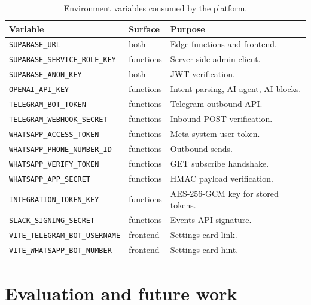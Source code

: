 \documentclass[11pt,a4paper,oneside]{article}
\newcommand{\code}[1]{\texttt{\small #1}}
\begin{document}
\begin{table}[H]
\centering
\small
\begin{tabularx}{\textwidth}{@{}llX@{}}
\toprule
\textbf{Variable}                  & \textbf{Surface} & \textbf{Purpose} \\
\midrule
\code{SUPABASE\_URL}               & both       & Edge functions and frontend. \\
\code{SUPABASE\_SERVICE\_ROLE\_KEY}& functions  & Server-side admin client. \\
\code{SUPABASE\_ANON\_KEY}         & both       & JWT verification. \\
\code{OPENAI\_API\_KEY}            & functions  & Intent parsing, AI agent, AI blocks. \\
\code{TELEGRAM\_BOT\_TOKEN}        & functions  & Telegram outbound API. \\
\code{TELEGRAM\_WEBHOOK\_SECRET}   & functions  & Inbound POST verification. \\
\code{WHATSAPP\_ACCESS\_TOKEN}     & functions  & Meta system-user token. \\
\code{WHATSAPP\_PHONE\_NUMBER\_ID} & functions  & Outbound sends. \\
\code{WHATSAPP\_VERIFY\_TOKEN}     & functions  & GET subscribe handshake. \\
\code{WHATSAPP\_APP\_SECRET}       & functions  & HMAC payload verification. \\
\code{INTEGRATION\_TOKEN\_KEY}     & functions  & AES-256-GCM key for stored tokens. \\
\code{SLACK\_SIGNING\_SECRET}      & functions  & Events API signature. \\
\code{VITE\_TELEGRAM\_BOT\_USERNAME}& frontend  & Settings card link. \\
\code{VITE\_WHATSAPP\_BOT\_NUMBER} & frontend   & Settings card hint. \\
\bottomrule
\end{tabularx}
\caption{Environment variables consumed by the platform.}
\label{tab:env}
\end{table}

\section{Evaluation and future work}\label{sec:future}
\end{document}
